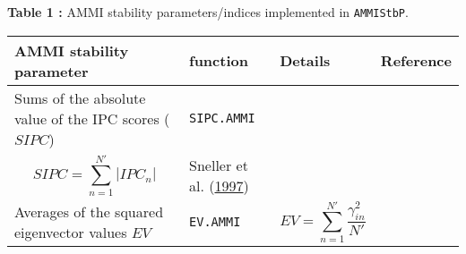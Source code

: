 \documentclass[]{article}
\begin{document}
\newpage
\begin{landscape}

\renewcommand{\arraystretch}{1.3}

\textbf{Table 1 :} AMMI stability parameters/indices implemented in
\texttt{AMMIStbP}. \footnotesize

\begin{longtable}[]{@{}llll@{}}
\toprule
\begin{minipage}[b]{0.14\columnwidth}\raggedright
AMMI stability parameter\strut
\end{minipage} & \begin{minipage}[b]{0.18\columnwidth}\raggedright
function\strut
\end{minipage} & \begin{minipage}[b]{0.36\columnwidth}\raggedright
Details\strut
\end{minipage} & \begin{minipage}[b]{0.20\columnwidth}\raggedright
Reference\strut
\end{minipage}\tabularnewline
\midrule
\endhead
\begin{minipage}[t]{0.14\columnwidth}\raggedright
Sums of the absolute value of the IPC scores (\(SIPC\))\strut
\end{minipage} & \begin{minipage}[t]{0.18\columnwidth}\raggedright
\texttt{SIPC.AMMI}\strut
\end{minipage} & \begin{minipage}[t]{0.36\columnwidth}\raggedright
\[SIPC =
\sum_{n=1}^{N'}
\left |
\lambda_{n}^{0.5}\gamma_{in}
\right
|\]\\
\[SIPC =
\sum_{n=1}^{N'}\left
| IPC_{n}
\right |\]\strut
\end{minipage} & \begin{minipage}[t]{0.20\columnwidth}\raggedright
Sneller et al.
(\protect\hyperlink{ref-sneller_repeatability_1997}{1997})\strut
\end{minipage}\tabularnewline
\begin{minipage}[t]{0.14\columnwidth}\raggedright
Averages of the squared eigenvector values \(EV\)\strut
\end{minipage} & \begin{minipage}[t]{0.18\columnwidth}\raggedright
\texttt{EV.AMMI}\strut
\end{minipage} & \begin{minipage}[t]{0.36\columnwidth}\raggedright
\[EV =
\sum_{n=1}^{N'}\frac{\gamma_{in}^2}{N'}\]\strut
\end{minipage} & \begin{minipage}[t]{0.20\columnwidth}\raggedright

\end{minipage}
\end{longtable}
\end{landscape}
\end{document}

